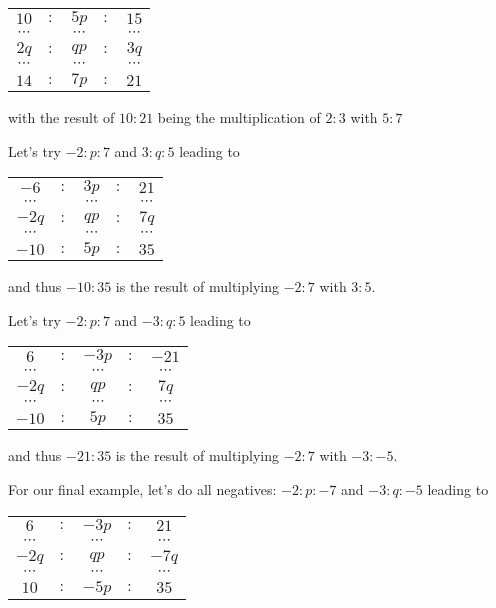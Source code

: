 \documentclass[12pt]{article}
\theoremstyle{remark}
\begin{document}
\begin{enumerate}
     \begin{tabular}{ccccc}
        $10$ &$:$& $5p$ &$:$& $15$ \\
        $\cdots$ & & $\cdots$ & & $\cdots$ \\
        $2q$ &$:$& $qp$ &$:$& $3q$\\
        $\cdots$ & & $\cdots$ & & $\cdots$ \\
         $14$ &$:$& $7p$&$:$& $21$
    \end{tabular}
    
    with the result of $10:21$ being the multiplication of $2:3$ with $5:7$
    
    Let's try $-2 : p : 7$ and $3: q : 5$ leading to
    
     \begin{tabular}{ccccc}
        $-6$ &$:$& $3p$ &$:$& $21$ \\
        $\cdots$ & & $\cdots$ & & $\cdots$ \\
        $-2q$ &$:$& $qp$ &$:$& $7q$\\
        $\cdots$ & & $\cdots$ & & $\cdots$ \\
         $-10$ &$:$& $5p$&$:$& $35$
    \end{tabular}
    
    and thus $-10:35$ is the result of multiplying $-2:7$ with $3:5$.

    Let's try $-2 : p : 7$ and $-3: q : 5$ leading to
    
     \begin{tabular}{ccccc}
        $6$ &$:$& $-3p$ &$:$& $-21$ \\
        $\cdots$ & & $\cdots$ & & $\cdots$ \\
        $-2q$ &$:$& $qp$ &$:$& $7q$\\
        $\cdots$ & & $\cdots$ & & $\cdots$ \\
         $-10$ &$:$& $5p$&$:$& $35$
    \end{tabular}
    
    and thus $-21:35$ is the result of multiplying $-2:7$ with $-3:-5$.

    For our final example, let's do all negatives: $-2 : p : -7$ and $-3: q : -5$ leading to
    
     \begin{tabular}{ccccc}
        $6$ &$:$& $-3p$ &$:$& $21$ \\
        $\cdots$ & & $\cdots$ & & $\cdots$ \\
        $-2q$ &$:$& $qp$ &$:$& $-7q$\\
        $\cdots$ & & $\cdots$ & & $\cdots$ \\
         $10$ &$:$& $-5p$&$:$& $35$
    \end{tabular}
    

\end{enumerate}
\end{document}
